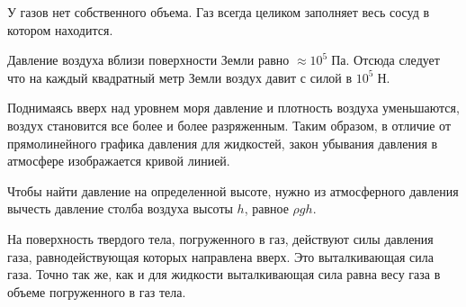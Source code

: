 \documentclass[a4paper,12pt]{article}
\begin{document}
		У газов нет собственного объема. Газ всегда целиком заполняет весь сосуд в котором
		находится. 

		Давление воздуха вблизи поверхности Земли равно $\approx 10^5 \; \text{Па}$.
		Отсюда следует что на каждый квадратный метр Земли воздух давит с силой в
		$10^5 \; \text{Н}$.

		Поднимаясь вверх над уровнем моря давление и плотность воздуха уменьшаются, 
		воздух становится все более и более разряженным.
		Таким образом, в отличие от прямолинейного графика давления для жидкостей, 
		закон убывания давления в атмосфере изображается кривой линией.

		Чтобы найти давление на определенной высоте, нужно из атмосферного давления 
		вычесть давление столба воздуха высоты $h$, равное $\rho g h$.

		На поверхность твердого тела, погруженного в газ, действуют силы давления газа,
		равнодействующая которых направлена вверх. Это выталкивающая сила газа. Точно 
		так же, как и для жидкости выталкивающая сила равна весу газа в объеме погруженного 
		в газ тела.

		
\end{document}

